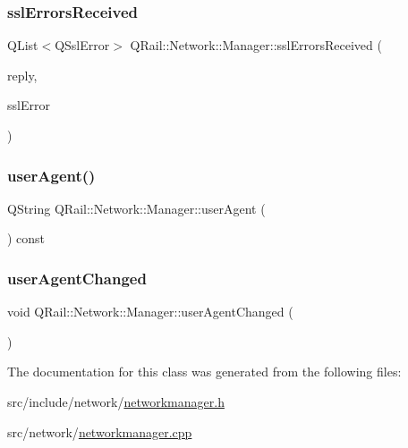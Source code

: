 \mbox{\label{classQRail_1_1Network_1_1Manager_a0404bf0008a42108b6e72ec5da12d02f}} 
\subsubsection{\texorpdfstring{sslErrorsReceived}{sslErrorsReceived}}
{\footnotesize\ttfamily Q\+List$<$Q\+Ssl\+Error$>$ Q\+Rail\+::\+Network\+::\+Manager\+::ssl\+Errors\+Received (\begin{DoxyParamCaption}\item[{Q\+Network\+Reply $\ast$}]{reply,  }\item[{Q\+List$<$ Q\+Ssl\+Error $>$}]{ssl\+Error }\end{DoxyParamCaption})\hspace{0.3cm}{\ttfamily [signal]}}

\mbox{\label{classQRail_1_1Network_1_1Manager_a8163075df6f472c3ae69e0cfa67a7da7}} 
\subsubsection{\texorpdfstring{userAgent()}{userAgent()}}
{\footnotesize\ttfamily Q\+String Q\+Rail\+::\+Network\+::\+Manager\+::user\+Agent (\begin{DoxyParamCaption}{ }\end{DoxyParamCaption}) const}

\mbox{\label{classQRail_1_1Network_1_1Manager_a7041109a640094b8aaeb430e6b09c9bc}} 
\subsubsection{\texorpdfstring{userAgentChanged}{userAgentChanged}}
{\footnotesize\ttfamily void Q\+Rail\+::\+Network\+::\+Manager\+::user\+Agent\+Changed (\begin{DoxyParamCaption}{ }\end{DoxyParamCaption})\hspace{0.3cm}{\ttfamily [signal]}}



The documentation for this class was generated from the following files\+:\begin{DoxyCompactItemize}
\item 
src/include/network/\mbox{\hyperlink{networkmanager_8h}{networkmanager.\+h}}\item 
src/network/\mbox{\hyperlink{networkmanager_8cpp}{networkmanager.\+cpp}}\end{DoxyCompactItemize}
